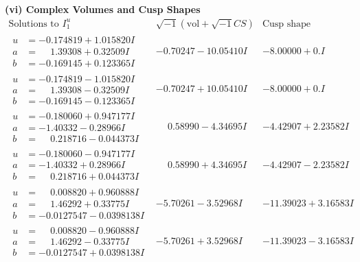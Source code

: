 \documentclass[1p]{elsarticle_modified}
\theoremstyle{definition}
\newcommand{\I}{\sqrt{-1}}
\begin{document}
\newpage\flushleft \textbf{(vi) Complex Volumes and Cusp Shapes}
$$\begin{array}{c|c|c}  
\text{Solutions to }I^u_{1}& \I (\text{vol} + \sqrt{-1}CS) & \text{Cusp shape}\\
 \hline 
\begin{aligned}
u &= -0.174819 + 1.015820 I \\
a &= \phantom{-}1.39308 + 0.32509 I \\
b &= -0.169145 + 0.123365 I\end{aligned}
 & -0.70247 - 10.05410 I & -8.00000 + 0. I\phantom{ +0.000000I} \\ \hline\begin{aligned}
u &= -0.174819 - 1.015820 I \\
a &= \phantom{-}1.39308 - 0.32509 I \\
b &= -0.169145 - 0.123365 I\end{aligned}
 & -0.70247 + 10.05410 I & -8.00000 + 0. I\phantom{ +0.000000I} \\ \hline\begin{aligned}
u &= -0.180060 + 0.947177 I \\
a &= -1.40332 - 0.28966 I \\
b &= \phantom{-}0.218716 - 0.044373 I\end{aligned}
 & \phantom{-}0.58990 - 4.34695 I & -4.42907 + 2.23582 I \\ \hline\begin{aligned}
u &= -0.180060 - 0.947177 I \\
a &= -1.40332 + 0.28966 I \\
b &= \phantom{-}0.218716 + 0.044373 I\end{aligned}
 & \phantom{-}0.58990 + 4.34695 I & -4.42907 - 2.23582 I \\ \hline\begin{aligned}
u &= \phantom{-}0.008820 + 0.960888 I \\
a &= \phantom{-}1.46292 + 0.33775 I \\
b &= -0.0127547 - 0.0398138 I\end{aligned}
 & -5.70261 - 3.52968 I & -11.39023 + 3.16583 I \\ \hline\begin{aligned}
u &= \phantom{-}0.008820 - 0.960888 I \\
a &= \phantom{-}1.46292 - 0.33775 I \\
b &= -0.0127547 + 0.0398138 I\end{aligned}
 & -5.70261 + 3.52968 I & -11.39023 - 3.16583 I \\ \hline\begin{aligned}

\end{aligned}
\end{array}$$
\end{document}
